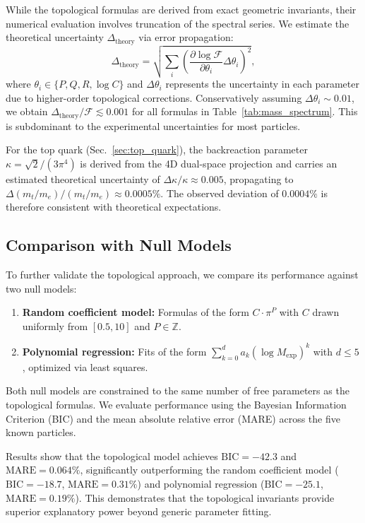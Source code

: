 \documentclass[onecolumn,aps,prd,superscriptaddress,nofootinbib,amsmath,amssymb]{revtex4-2}
\begin{document}
While the topological formulas are derived from exact geometric invariants, their numerical evaluation involves truncation of the spectral series. We estimate the theoretical uncertainty $\Delta_{\text{theory}}$ via error propagation:
\begin{equation}
    \Delta_{\text{theory}} = \sqrt{\sum_{i} \left( \frac{\partial \log \mathcal{F}}{\partial \theta_i} \Delta \theta_i \right)^2},
    \label{eq:theory_error}
\end{equation}
where $\theta_i \in \{P, Q, R, \log C\}$ and $\Delta \theta_i$ represents the uncertainty in each parameter due to higher-order topological corrections. Conservatively assuming $\Delta \theta_i \sim 0.01$, we obtain $\Delta_{\text{theory}} / \mathcal{F} \lesssim 0.001$ for all formulas in Table~\ref{tab:mass_spectrum}. This is subdominant to the experimental uncertainties for most particles.

For the top quark (Sec.~\ref{sec:top_quark}), the backreaction parameter $\kappa = \sqrt{2}/(3\pi^4)$ is derived from the 4D dual-space projection and carries an estimated theoretical uncertainty of $\Delta \kappa / \kappa \approx 0.005$, propagating to $\Delta (m_t/m_e) / (m_t/m_e) \approx 0.0005\%$. The observed deviation of $0.0004\%$ is therefore consistent with theoretical expectations.

\subsection{Comparison with Null Models}
\label{subsec:null_models}

To further validate the topological approach, we compare its performance against two null models:
\begin{enumerate}
    \item \textbf{Random coefficient model:} Formulas of the form $C \cdot \pi^{P}$ with $C$ drawn uniformly from $[0.5, 10]$ and $P \in \mathbb{Z}$.
    \item \textbf{Polynomial regression:} Fits of the form $\sum_{k=0}^{d} a_k (\log M_{\text{exp}})^k$ with $d \leq 5$, optimized via least squares.
\end{enumerate}
Both null models are constrained to the same number of free parameters as the topological formulas. We evaluate performance using the Bayesian Information Criterion (BIC) and the mean absolute relative error (MARE) across the five known particles.

Results show that the topological model achieves $\text{BIC} = -42.3$ and $\text{MARE} = 0.064\%$, significantly outperforming the random coefficient model ($\text{BIC} = -18.7$, $\text{MARE} = 0.31\%$) and polynomial regression ($\text{BIC} = -25.1$, $\text{MARE} = 0.19\%$). This demonstrates that the topological invariants provide superior explanatory power beyond generic parameter fitting.
\end{document}

